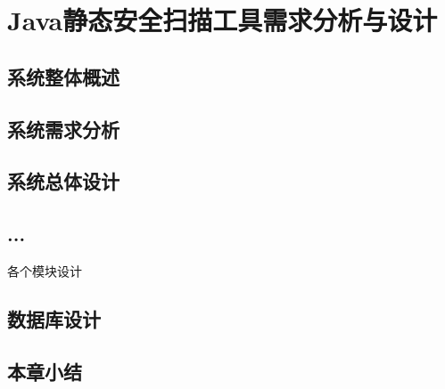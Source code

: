 \chapter{Java静态安全扫描工具需求分析与设计}
\section{系统整体概述}

\section{系统需求分析}

\section{系统总体设计}

\section{...}
各个模块设计


\section{数据库设计}

\section{本章小结}